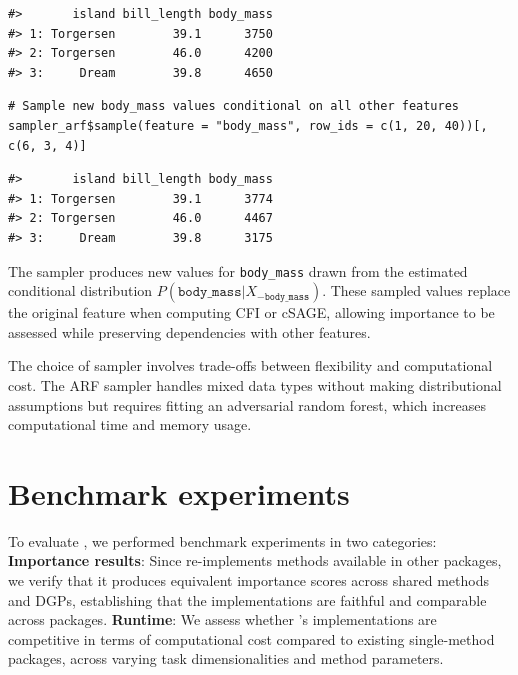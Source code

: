 \begin{verbatim}
#>       island bill_length body_mass
#> 1: Torgersen        39.1      3750
#> 2: Torgersen        46.0      4200
#> 3:     Dream        39.8      4650
\end{verbatim}

\begin{verbatim}
# Sample new body_mass values conditional on all other features
sampler_arf$sample(feature = "body_mass", row_ids = c(1, 20, 40))[, c(6, 3, 4)]
\end{verbatim}

\begin{verbatim}
#>       island bill_length body_mass
#> 1: Torgersen        39.1      3774
#> 2: Torgersen        46.0      4467
#> 3:     Dream        39.8      3175
\end{verbatim}

The sampler produces new values for \texttt{body\_mass} drawn from the estimated conditional distribution \(P(\mathtt{body\_mass} | X_{-\mathtt{body\_mass}})\).
These sampled values replace the original feature when computing CFI or cSAGE, allowing importance to be assessed while preserving dependencies with other features.

The choice of sampler involves trade-offs between flexibility and computational cost.
The ARF sampler handles mixed data types without making distributional assumptions but requires fitting an adversarial random forest, which increases computational time and memory usage.

\section{Benchmark experiments}\label{sec-benchmark}

To evaluate , we performed benchmark experiments in two categories:
\textbf{Importance results}: Since  re-implements methods available in other packages, we verify that it produces equivalent importance scores across shared methods and DGPs, establishing that the implementations are faithful and comparable across packages.
\textbf{Runtime}: We assess whether 's implementations are competitive in terms of computational cost compared to existing single-method packages, across varying task dimensionalities and method parameters.

